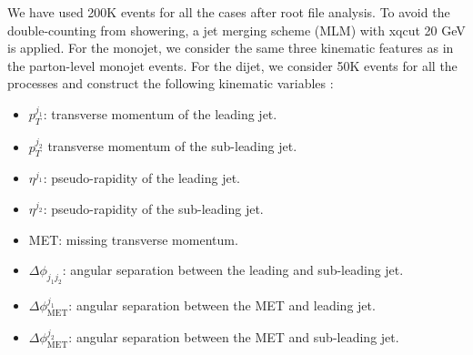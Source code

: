 \documentclass[prd,aps,letterpaper,floatfix,superscriptaddress,preprintnumbers,twocolumn,10pt,nofootinbib]{revtex4-1}
\begin{document}
We have used 200K events for all the cases after root file analysis. To avoid the double-counting from showering, a jet merging scheme (MLM)
with xqcut 20 GeV is applied. For the monojet, we consider the same three kinematic features  as in the parton-level monojet events. For the dijet, we consider 50K events for all the processes and
construct the following kinematic variables :
\begin{itemize}
\item $p_T^{j_1}$: transverse momentum of the leading jet.
\item  $p_T^{j_2}$ transverse momentum of the sub-leading jet. 
\item  $\eta^{j_1}$: pseudo-rapidity of the leading jet.
\item  $\eta^{j_2}$: pseudo-rapidity of the sub-leading jet. 
\item  MET: missing transverse momentum.
\item  $\Delta \phi_{j_1j_2}$: angular separation between the leading and sub-leading jet.
\item  $\Delta \phi_{\text{MET}}^{j_1}$: angular separation between the MET and leading jet.
\item  $\Delta \phi_{\text{MET}}^{j_2}$: angular separation between the MET and sub-leading jet.
\end{itemize}
\end{document}

